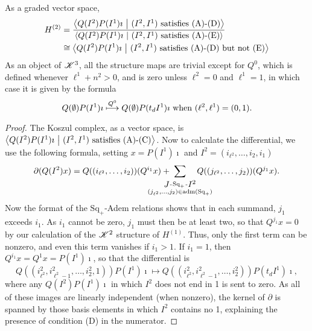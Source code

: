 \documentclass[11pt]{article}
\makeatletter
\newcommand{\LL}[1]{{\scrK}^{#1}}%
\newcommand{\produces}[3]{{#1}{#3}{#2}}
\newcommand{\admis}[1]{\mathrm{adm}(#1)}%
\renewcommand{\Q}{Q}
\newcommand{\SqShift}{\Sq_{+}}
\newcommand{\Sq}{\mathrm{Sq}}
\renewcommand{\produces}[3]{
{
\def\labelstyle{\scriptstyle}
\xymatrix@C=2em@1{
{#1}
\ar@{-}[r]|-{{\,#3\,}}
&%
{#2}%
}}}
\makeatother
\begin{document}
\begin{CalculatingRepeatedKoszul}
\begin{prop*}
As a graded vector space,
\begin{alignat*}{2}
H^{(2)}
&=
\frac{\left\langle \Q(I^2)P(I^1)\imath\ \middle|\  (I^2,I^1)\textup{ satisfies (A)-(D)}\right\rangle}{\left\langle \Q(I^2)P(I^1)\imath\ \middle|\  (I^2,I^1)\textup{ satisfies (A)-(E)}\right\rangle}%
\\
&\cong
{\left\langle \Q(I^2)P(I^1)\imath\ \middle|\  (I^2,I^1)\textup{ satisfies (A)-(D) but not (E)}\right\rangle}%
\end{alignat*}
As an object of $\LL{3}$, all the structure maps are trivial except for $\Q^0$, which is defined whenever $\ell^1+n^2>0$, and is zero unless $\ell^2=0$ and $\ell^1=1$, in which case it is given by the formula \[\Q(\emptyset)P(I^1)\imath \overset{\Q^0}{\mapsto} \Q(\emptyset)P(t_dI^1)\imath\textup{ when $(\ell^2,\ell^1)=(0,1)$}.\]
\end{prop*}
\begin{proof}
The Koszul complex, as a vector space, is $\left\langle \Q(I^2)P(I^1)\imath\ \middle|\ (I^2,I^1)\textup{ satisfies (A)-(C)}\right\rangle$. %
Now to calculate the differential, we use the following formula, setting $x=P(I^1)\imath$ and $I^2=(i_{\ell^2},\ldots,i_2,i_1)$
\[\partial(\Q(I^2)x)=\Q((i_{\ell^2},\ldots,i_2))(\Q^{i_1}x)+\!\!\!\!\!\!\!\!\!\!\!\!\!\!\!\!\!\sum_{\substack{\produces{J}{I^2}{\SqShift}\\(j_{\ell^2},\ldots,j_2)\in\admis{\SqShift}}}\!\!\!\!\!\!\!\!\!\!\!\! \Q((j_{\ell^2},\ldots,j_2))(\Q^{j_1}x).\]
Now the format of the $\SqShift$-Adem relations shows that in each summand, $j_1$ exceeds $i_1$. As $i_1$ cannot be zero, $j_1$ must then be at least two, so that $Q^{j_1}x=0$ by our calculation of the $\LL{2}$ structure of $H^{(1)}$. Thus, only the first term can be nonzero, and even this term vanishes if $i_1>1$. If $i_1=1$, then $\Q^{i_1}x=\Q^1x=P(I^1)\imath$, so that the differential is
\[\Q((i^2_{\ell^2},i^2_{\ell^2-1},\ldots,i^2_{2},1))P(I^1)\imath\mapsto \Q((i^2_{\ell^2},i^2_{\ell^2-1},\ldots,i^2_{2}))P(t_dI^1)\imath,\]
where any $\Q(I^2)P(I^1)\imath$ in which $I^2$ does not end in 1 is sent to zero. As all of these images are linearly independent (when nonzero), the kernel of $\partial$ is spanned by those basis elements in which $I^2$ contains no 1, explaining the presence of condition (D) in the numerator.


\end{proof}
\end{CalculatingRepeatedKoszul}
\end{document}
